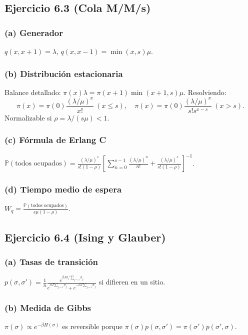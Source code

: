 \documentclass[letterpaper, 12pt]{article}
\renewcommand{\P}{\mathbb{P}}
\newcommand{\1}{\mathbbm{1}}
\begin{document}
    \subsection{Ejercicio 6.3 (Cola M/M/s)}

    \subsubsection*{(a) Generador}
    $q(x,x+1)=\lambda$, $q(x,x-1)=\min(x,s)\mu$.

    \subsubsection*{(b) Distribuci\'on estacionaria}
    Balance detallado: $\pi(x)\lambda=\pi(x+1)\min(x+1,s)\mu$. Resolviendo:
    \[
    \pi(x)=\pi(0)\frac{(\lambda/\mu)^x}{x!}\ (x\le s),\quad \pi(x)=\pi(0)\frac{(\lambda/\mu)^x}{s!s^{x-s}}\ (x>s).
    \]
    Normalizable si $\rho=\lambda/(s\mu)<1$.

    \subsubsection*{(c) F\'ormula de Erlang C}
    $\P(\text{todos ocupados})=\frac{(\lambda/\mu)^s}{s!(1-\rho)}\left[\sum_{n=0}^{s-1}\frac{(\lambda/\mu)^n}{n!}+\frac{(\lambda/\mu)^s}{s!(1-\rho)}\right]^{-1}$.

    \subsubsection*{(d) Tiempo medio de espera}
    $W_q=\frac{\P(\text{todos ocupados})}{s\mu(1-\rho)}$.

    \subsection{Ejercicio 6.4 (Ising y Glauber)}

    \subsubsection*{(a) Tasas de transici\'on}
    $p(\sigma,\sigma')=\frac1n\frac{e^{\beta J\sigma_i'\sum_{j\sim i}\sigma_j}}{e^{\beta J\sum_{j\sim i}\sigma_j}+e^{-\beta J\sum_{j\sim i}\sigma_j}}$ si difieren en un sitio.

    \subsubsection*{(b) Medida de Gibbs}
    $\pi(\sigma)\propto e^{-\beta H(\sigma)}$ es reversible porque $\pi(\sigma)p(\sigma,\sigma')=\pi(\sigma')p(\sigma',\sigma)$.
\end{document}
